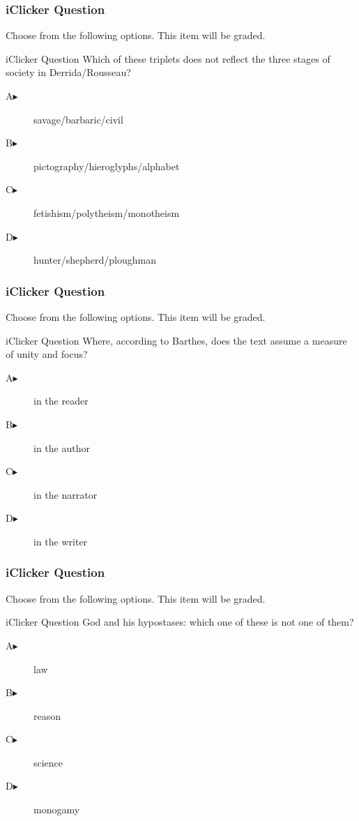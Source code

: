 \documentclass[xcolor=dvipsnames]{beamer}
\begin{document}
\begin{frame}
  \frametitle{iClicker Question}
Choose from the following options. This item will be graded.
\begin{block}{iClicker Question}
Which of these triplets does not reflect the three stages of society in Derrida/Rousseau?
\end{block}
\begin{description}
\item[A\hspace{.2in}$\blacktriangleright$] savage/barbaric/civil
\item[B\hspace{.2in}$\blacktriangleright$] pictography/hieroglyphs/alphabet
\item[C\hspace{.2in}$\blacktriangleright$] fetishism/polytheism/monotheism
\item[D\hspace{.2in}$\blacktriangleright$] hunter/shepherd/ploughman
\end{description}
\end{frame}

\begin{frame}
  \frametitle{iClicker Question}
Choose from the following options. This item will be graded.
\begin{block}{iClicker Question}
Where, according to Barthes, does the text assume a measure of unity
and focus?
\end{block}
\begin{description}
\item[A\hspace{.2in}$\blacktriangleright$] in the reader
\item[B\hspace{.2in}$\blacktriangleright$] in the author
\item[C\hspace{.2in}$\blacktriangleright$] in the narrator
\item[D\hspace{.2in}$\blacktriangleright$] in the writer
\end{description}
\end{frame}

\begin{frame}
  \frametitle{iClicker Question}
Choose from the following options. This item will be graded.
\begin{block}{iClicker Question}
God and his hypostases: which one of these is not one of them?
\end{block}
\begin{description}
\item[A\hspace{.2in}$\blacktriangleright$] law
\item[B\hspace{.2in}$\blacktriangleright$] reason
\item[C\hspace{.2in}$\blacktriangleright$] science
\item[D\hspace{.2in}$\blacktriangleright$] monogamy
\end{description}
\end{frame}
\end{document}
